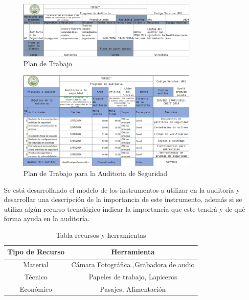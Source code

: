 \documentclass[12pt,a4paper]{article}
\begin{document}
\begin{figure}[!htb]
    \centering
    \includegraphics[width=0.8\textwidth]{images/planTrabajo.png}
    \caption{Plan de Trabajo}
    
\end{figure}
\FloatBarrier
\begin{figure}[!htb]
    \centering
    \includegraphics[width=0.8\textwidth]{images/planEjecucion.png}
    \caption{Plan de Trabajo para la Auditoria de Seguridad}
    
\end{figure}
Se está desarrollando el modelo de los instrumentos a utilizar en la auditoría y desarrollar una
descripción de la importancia de este instrumento, además si se utiliza algún recurso tecnológico
indicar la importancia que este tendrá y de qué forma ayuda en la auditoría.

\begin{table}[ht]
    \centering
    \begin{tabular}{cc}
        \toprule
        \textbf{Tipo de Recurso} & \textbf{Herramienta} \\
        \midrule
        Material  &  Cámara Fotográfica ,Grabadora de audio  \\
        Técnico   & Papeles de trabajo, Lapiceros \\
        Económico &  Pasajes, Alimentación \\
        \bottomrule
    \end{tabular}
    \caption{Tabla recursos y herramientas}
    
\end{table}
\end{document}
